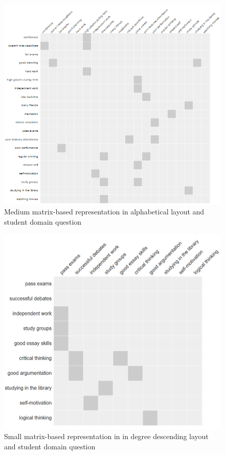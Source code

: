 \documentclass{l4proj}
\begin{document}
\begin{appendices}
\begin{figure}[H]
\centering
\includegraphics[width=15cm]{images/studentMedAlpha.PNG}
\caption{Medium matrix-based representation in alphabetical layout and student domain question}
\label{studentMedAlpha}
\end{figure}


\begin{figure}[H]
\centering
\includegraphics[width=15cm]{images/studentSmallInDD.PNG}
\caption{Small matrix-based representation in in degree descending layout and student domain question}
\label{studentSmallInDD}
\end{figure}


\end{appendices}
\end{document}
